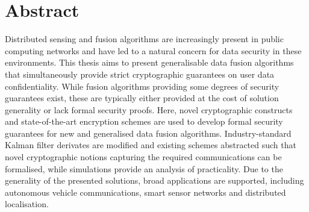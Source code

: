\documentclass[oneside]{scrbook}
\theoremstyle{definition}
\theoremstyle{definition}
\theoremstyle{remark}
\begin{document}
\chapter{Abstract}
Distributed sensing and fusion algorithms are increasingly present in public computing networks and have led to a natural concern for data security in these environments. This thesis aims to present generalisable data fusion algorithms that simultaneously provide strict cryptographic guarantees on user data confidentiality. While fusion algorithms providing some degrees of security guarantees exist, these are typically either provided at the cost of solution generality or lack formal security proofs. Here, novel cryptographic constructs and state-of-the-art encryption schemes are used to develop formal security guarantees for new and generalised data fusion algorithms. Industry-standard Kalman filter derivates are modified and existing schemes abstracted such that novel cryptographic notions capturing the required communications can be formalised, while simulations provide an analysis of practicality. Due to the generality of the presented solutions, broad applications are supported, including autonomous vehicle communications, smart sensor networks and distributed localisation.

% 
%                                                               
%                                                               
%                                                               
% 
\end{document}
